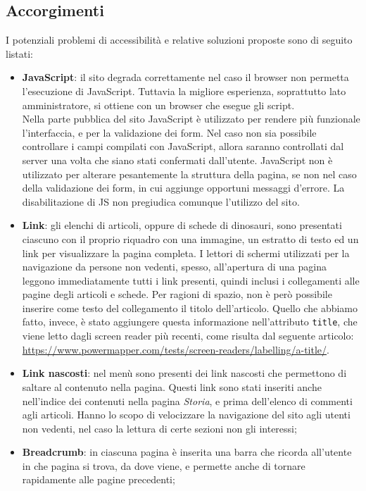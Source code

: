 \documentclass[12pt]{article}
\newcommand{\code}[1]{\texttt{#1}}
\begin{document}
	\subsection{Accorgimenti}
	I potenziali problemi di accessibilità e relative soluzioni proposte sono di seguito listati:
	\begin{itemize}
		\item \textbf{JavaScript}: il sito degrada correttamente nel caso il browser non permetta l'esecuzione di JavaScript. Tuttavia la migliore esperienza, soprattutto lato amministratore, si ottiene con un browser che esegue gli script. \\
		Nella parte pubblica del sito JavaScript è utilizzato per rendere più funzionale l'interfaccia, e per la validazione dei form. Nel caso non sia possibile controllare i campi compilati con JavaScript, allora saranno controllati dal server una volta che siano stati confermati dall'utente. JavaScript non è utilizzato per alterare pesantemente la struttura della pagina, se non nel caso della validazione dei form, in cui aggiunge opportuni messaggi d'errore. La disabilitazione di JS non pregiudica comunque l'utilizzo del sito.
		\item \textbf{Link}: gli elenchi di articoli, oppure di schede di dinosauri, sono presentati ciascuno con il proprio riquadro con una immagine, un estratto di testo ed un link per visualizzare la pagina completa. I lettori di schermi utilizzati per la navigazione da persone non vedenti, spesso, all'apertura di una pagina leggono immediatamente tutti i link presenti, quindi inclusi i collegamenti alle pagine degli articoli e schede.
		Per ragioni di spazio, non è però possibile inserire come testo del collegamento il titolo dell'articolo. Quello che abbiamo fatto, invece, è stato aggiungere questa informazione nell'attributo \code{title}, che viene letto dagli screen reader più recenti, come risulta dal seguente articolo: \url{https://www.powermapper.com/tests/screen-readers/labelling/a-title/}.
		\item \textbf{Link nascosti}: nel menù sono presenti dei link nascosti che permettono di saltare al contenuto nella pagina. Questi link sono stati inseriti anche nell'indice dei contenuti nella pagina \textit{Storia}, e prima dell'elenco di commenti agli articoli. Hanno lo scopo di velocizzare la navigazione del sito agli utenti non vedenti, nel caso la lettura di certe sezioni non gli interessi;
		\item \textbf{Breadcrumb}: in ciascuna pagina è inserita una barra che ricorda all'utente in che pagina si trova, da dove viene, e permette anche di tornare rapidamente alle pagine precedenti;
	\end{itemize}
	
\end{document}
